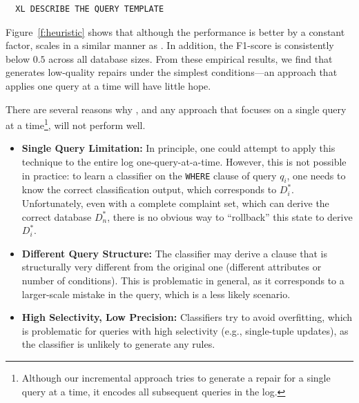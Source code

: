 \begin{verbatim}
  XL DESCRIBE THE QUERY TEMPLATE
\end{verbatim}

Figure~\ref{f:heuristic} shows that although the performance is better by  a constant factor,
\dt scales in a similar manner as \sys.  In addition, the F1-score is consistently below $0.5$ across all database sizes.
From these empirical results, we find that \dt generates low-quality repairs under the simplest conditions---an approach
that applies \dt one query at a time will have little hope.


There are several reasons why \dt, and any approach that focuses on a single query at a 
time\footnote{Although our incremental approach tries to generate a repair for a single
query at a time, it encodes all subsequent queries in the log.}, will not perform well.

\begin{itemize}[itemsep=1pt, leftmargin=5mm]
    
\item \textbf{Single Query Limitation: }
In principle, one could attempt to apply this technique to the
entire log one-query-at-a-time. However, this is not possible in
practice: to learn a classifier on the \texttt{WHERE} clause of query
$q_i$, one needs to know the correct classification output, which
corresponds to $D_i^*$. Unfortunately, even with a complete complaint
set, which can derive the correct database $D_n^*$, there is no
obvious way to ``rollback'' this state to derive $D_i^*$.

\item \textbf{Different Query Structure: } 
The classifier may derive a clause that is structurally very
different from the original one (different attributes or number of
conditions). This is problematic in general, as it corresponds to a
larger-scale mistake in the query, which is a less likely scenario.

\item \textbf{High Selectivity, Low Precision: }
Classifiers try to avoid overfitting, which is problematic for
queries with high selectivity (e.g., single-tuple updates), as the
classifier is unlikely to generate any rules.

\end{itemize}


